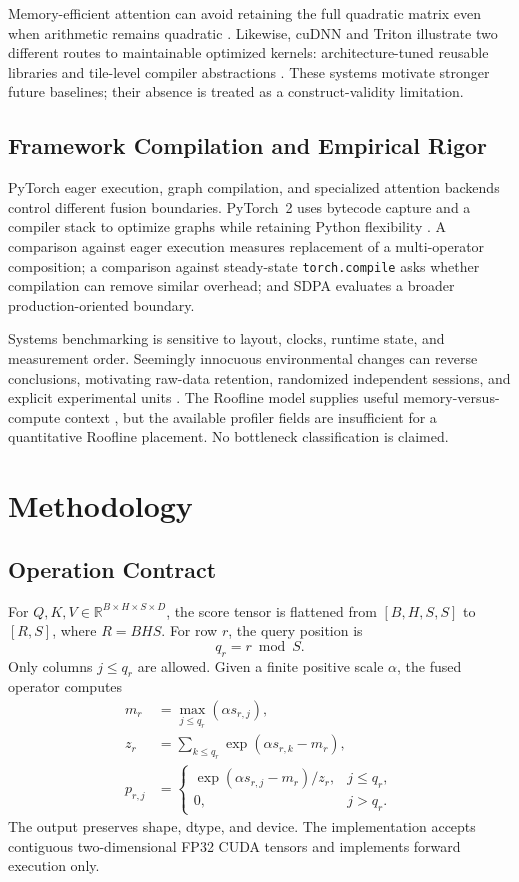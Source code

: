 \documentclass[twoside,twocolumn,10pt]{article}
\newcommand{\code}[1]{\texttt{#1}}
\begin{document}
Memory-efficient attention can avoid retaining the full quadratic matrix even
when arithmetic remains quadratic \cite{rabe2021}. Likewise, cuDNN and Triton
illustrate two different routes to maintainable optimized kernels:
architecture-tuned reusable libraries and tile-level compiler abstractions
\cite{cudnn2014,triton2019}. These systems motivate stronger future baselines;
their absence is treated as a construct-validity limitation.

\subsection{Framework Compilation and Empirical Rigor}

PyTorch eager execution, graph compilation, and specialized attention backends
control different fusion boundaries. PyTorch~2 uses bytecode capture and a
compiler stack to optimize graphs while retaining Python flexibility
\cite{pytorch2_2024}. A comparison against eager execution measures replacement
of a multi-operator composition; a comparison against steady-state
\code{torch.compile} asks whether compilation can remove similar overhead; and
SDPA evaluates a broader production-oriented boundary.

Systems benchmarking is sensitive to layout, clocks, runtime state, and
measurement order. Seemingly innocuous environmental changes can reverse
conclusions, motivating raw-data retention, randomized independent sessions,
and explicit experimental units \cite{mytkowicz2009,stabilizer2013}. The
Roofline model supplies useful memory-versus-compute context
\cite{roofline2009}, but the available profiler fields are insufficient for a
quantitative Roofline placement. No bottleneck classification is claimed.

\section{Methodology}

\subsection{Operation Contract}

For $Q,K,V\in\mathbb{R}^{B\times H\times S\times D}$, the score tensor is
flattened from $[B,H,S,S]$ to $[R,S]$, where $R=BHS$. For row $r$, the query
position is
\begin{equation}
q_r=r\bmod S.
\end{equation}
Only columns $j\le q_r$ are allowed. Given a finite positive scale $\alpha$,
the fused operator computes
\begin{align}
m_r &= \max_{j\le q_r}(\alpha s_{r,j}),\\
z_r &= \sum_{k\le q_r}\exp(\alpha s_{r,k}-m_r),\\
p_{r,j} &=
\begin{cases}
\exp(\alpha s_{r,j}-m_r)/z_r,&j\le q_r,\\
0,&j>q_r.
\end{cases}
\label{eq:fused}
\end{align}
The output preserves shape, dtype, and device. The implementation accepts
contiguous two-dimensional FP32 CUDA tensors and implements forward execution
only.
\end{document}
